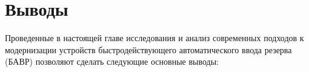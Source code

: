 
\section{Выводы}
\label{sec:ch02_conclusions}

Проведенные в настоящей главе исследования и анализ современных подходов к модернизации устройств быстродействующего автоматического ввода резерва (БАВР) позволяют сделать следующие основные выводы:\par\vspace{0.2cm}

